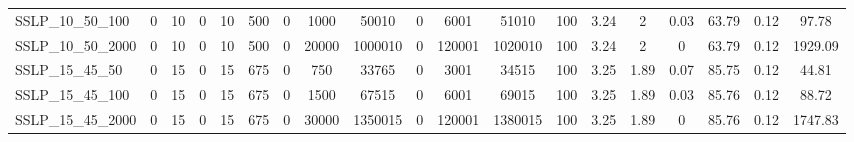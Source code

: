 \begin{table}[H]
{{\begin{tabular}{|l|ccc|ccc|ccccc|cccc|ccc|}
				SSLP\_10\_50\_100              & 0         & 10       & 0       & 10            & 500          & 0            & 1000  & 50010   & 0   & 6001   & 51010   & 100     & 3.24    & 2       & 0.03  & 63.79     & 0.12     & 97.78        \\
				SSLP\_10\_50\_2000             & 0         & 10       & 0       & 10            & 500          & 0            & 20000 & 1000010 & 0   & 120001 & 1020010 & 100     & 3.24    & 2       & 0     & 63.79     & 0.12     & 1929.09      \\
				SSLP\_15\_45\_50               & 0         & 15       & 0       & 15            & 675          & 0            & 750   & 33765   & 0   & 3001   & 34515   & 100     & 3.25    & 1.89    & 0.07  & 85.75     & 0.12     & 44.81        \\
				SSLP\_15\_45\_100              & 0         & 15       & 0       & 15            & 675          & 0            & 1500  & 67515   & 0   & 6001   & 69015   & 100     & 3.25    & 1.89    & 0.03  & 85.76     & 0.12     & 88.72        \\
				SSLP\_15\_45\_2000             & 0         & 15       & 0       & 15            & 675          & 0            & 30000 & 1350015 & 0   & 120001 & 1380015 & 100     & 3.25    & 1.89    & 0     & 85.76     & 0.12     & 1747.83      \\ \hline
			\end{tabular}
		}
	}
\end{table}


